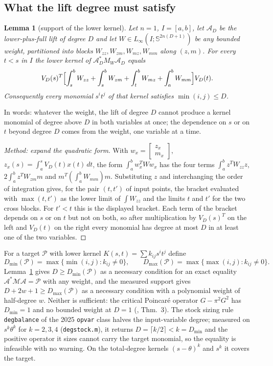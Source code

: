 \documentclass[12pt]{article}
\newcommand{\mcl}[1]{\mathcal{#1}}
\newcommand{\bmat}[1]{\begin{bmatrix} #1 \end{bmatrix}}
\newcommand{\code}[1]{\texttt{#1}}
\newcommand{\file}[1]{\path{#1}}      %
\theoremstyle{plain}
\newtheorem{lemma}[theorem]{Lemma}
\theoremstyle{definition}
\theoremstyle{remark}
\begin{document}
\subsection{What the lift degree must satisfy}

\begin{lemma}[support of the lower kernel]\label{lem:shape}
Let $n=1$, $I=[a,b]$, let $\mcl A_D$ be the lower-plus-full lift of degree $D$ and let $W\in L_\infty(I;\mathbb S^{2n(D+1)})$ be any bounded weight, partitioned into blocks $W_{zz},W_{zm},W_{mz},W_{mm}$ along $(z,m)$. For every $t<s$ in $I$ the lower kernel of $\mcl A_D^*M_W\mcl A_D$ equals
\[
V_D(s)^T\Bigl[\int_s^bW_{zz}+\int_s^bW_{zm}+\int_t^bW_{mz}+\int_a^bW_{mm}\Bigr]V_D(t).
\]
Consequently every monomial $s^it^j$ of that kernel satisfies $\min(i,j)\le D$.
\end{lemma}
In words: whatever the weight, the lift of degree $D$ cannot produce a kernel monomial of degree above $D$ in both variables at once; the dependence on $s$ or on $t$ beyond degree $D$ comes from the weight, one variable at a time.

\begin{proof}[Method: expand the quadratic form]
With $w_x=\bmat{z_x\\m_x}$, $z_x(s)=\int_a^sV_D(t)x(t)\,dt$, the form $\int_a^bw_x^TWw_x$ has the four terms $\int_a^b z^TW_{zz}z$, $2\int_a^bz^TW_{zm}m$ and $m^T(\int_a^bW_{mm})m$. Substituting $z$ and interchanging the order of integration gives, for the pair $(t,t')$ of input points, the bracket evaluated with $\max(t,t')$ as the lower limit of $\int W_{zz}$ and the limits $t$ and $t'$ for the two cross blocks. For $t'<t$ this is the displayed bracket. Each term of the bracket depends on $s$ or on $t$ but not on both, so after multiplication by $V_D(s)^T$ on the left and $V_D(t)$ on the right every monomial has degree at most $D$ in at least one of the two variables.
\end{proof}

For a target $\mcl P$ with lower kernel $K(s,t)=\sum k_{ij}s^it^j$ define
\[
D_{\min}(\mcl P)=\max\{\min(i,j):k_{ij}\ne0\},\qquad D_{\max}(\mcl P)=\max\{\max(i,j):k_{ij}\ne0\}.
\]
Lemma~\ref{lem:shape} gives $D\ge D_{\min}(\mcl P)$ as a necessary condition for an exact equality $\mcl A^*\mcl M\mcl A=\mcl P$ with any weight, and the measured support gives $D+2w+1\ge D_{\max}(\mcl P)$ as a necessary condition with a polynomial weight of half-degree $w$. Neither is sufficient: the critical Poincar\'e operator $G-\pi^2G^2$ has $D_{\min}=1$ and no bounded weight at $D=1$ (\file{path_b_signed_dual_2026_10_05.md}, Thm.~3). The stock sizing rule \code{degbalance} of the 2025 \code{opvar} class halves the input-variable degree; measured on $s^k\theta^k$ for $k=2,3,4$ (\code{degstock.m}), it returns $D=\lceil k/2\rceil<k=D_{\min}$ and the positive operator it sizes cannot carry the target monomial, so the equality is infeasible with no warning. On the total-degree kernels $(s-\theta)^k$ and $s^k$ it covers the target.
\end{document}
